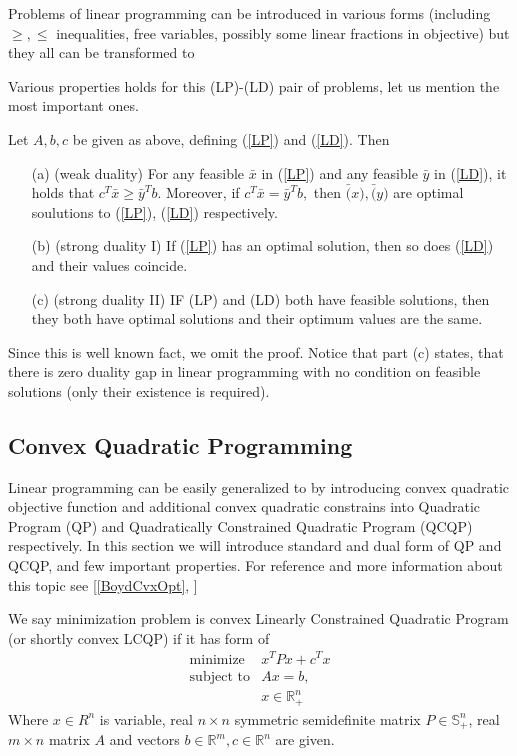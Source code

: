 \documentclass[10pt,oneside]{book}
\theoremstyle{definition}
\begin{document}
\rem Problems of linear programming can be introduced in various forms (including $\geq , \leq$ inequalities, free variables, possibly some linear fractions in objective) but they all can be transformed to 


Various properties holds for this (LP)-(LD) pair of problems, let us mention the most important ones.

{\thm
\label{StrongDualityLP}
 Let $A,b,c$ be given as above, defining (\ref{LP}) and (\ref{LD}). Then 
\begin{enumerate}
\item[\rm (a)] (weak duality)  For any feasible $\bar{x}$ in (\ref{LP}) and any feasible $\bar{y}$ in (\ref{LD}), it holds that $c^T\bar{x}\geq \bar{y}^Tb.$ Moreover, if $c^T\bar{x} = \bar{y}^Tb,$ then $\bar(x), \bar(y)$ are optimal soulutions to (\ref{LP}), (\ref{LD}) respectively.
\item[\rm (b)] (strong duality I) If (\ref{LP}) has an optimal solution, then so does (\ref{LD}) and their values coincide.
\item[\rm (c)] (strong duality II) IF (LP) and (LD) both have feasible solutions, then they both have optimal solutions and their optimum values are the same.
\end{enumerate}}

Since this is well known fact, we omit the proof. Notice that part (c) states, that  there is zero duality gap in linear programming with no condition on feasible solutions (only their existence is required). 



\subsection{Convex Quadratic Programming}

Linear programming can be easily generalized to by introducing convex quadratic objective function and additional convex quadratic constrains into Quadratic Program (QP) and Quadratically Constrained Quadratic Program (QCQP) respectively.
In this section we will introduce standard and dual form of QP and QCQP, and few important properties. For reference and more information about this topic see [\ref{BoydCvxOpt},   ] 


\label{defQP}
We say minimization problem is convex Linearly Constrained Quadratic Program (or shortly convex LCQP) if it has form of 
\begin{equation}
\label{LCQP} 
\begin{array}{ll}
\mbox{minimize} & x^TPx + c^Tx \\
\mbox{subject to}& Ax = b ,  \\
& x \in \mathbb{R}^n_+
\end{array} 
\tag{LCQP}
\end{equation}
Where $x\in R^n$ is variable, real $n\times n$ symmetric semidefinite matrix $P\in \mathbb{S}^n_+$, real $m\times n$ matrix $A$ and vectors $b \in \mathbb{R}^m, c\in \mathbb{R}^n$ are given.
\end{document}

